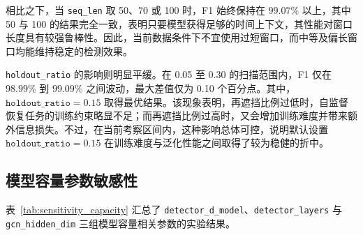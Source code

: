 \documentclass[bachelor, vlined]{DissertUESTC}
\begin{document}
    相比之下，当 \texttt{seq\_len} 取 50、70 或 100 时，F1 始终保持在 \(99.07\%\) 以上，其中 50 与 100 的结果完全一致，表明只要模型获得足够的时间上下文，其性能对窗口长度具有较强鲁棒性。因此，当前数据条件下不宜使用过短窗口，而中等及偏长窗口均能维持稳定的检测效果。

    \texttt{holdout\_ratio} 的影响则明显平缓。在 0.05 至 0.30 的扫描范围内，F1 仅在 \(98.99\%\) 到 \(99.09\%\) 之间波动，最大差值仅为 0.10 个百分点。其中，\(\texttt{holdout\_ratio}=0.15\) 取得最优结果。该现象表明，再遮挡比例过低时，自监督恢复任务的训练约束略显不足；而再遮挡比例过高时，又会增加训练难度并带来额外信息损失。不过，在当前考察区间内，这种影响总体可控，说明默认设置 \(\texttt{holdout\_ratio}=0.15\) 在训练难度与泛化性能之间取得了较为稳健的折中。

    \subsection{模型容量参数敏感性}

    表~\ref{tab:sensitivity_capacity} 汇总了 \texttt{detector\_d\_model}、\texttt{detector\_layers} 与 \texttt{gcn\_hidden\_dim} 三组模型容量相关参数的实验结果。

    \begin{table}[htbp]
        \centering
        \caption{模型容量相关参数的敏感性结果}
        \label{tab:sensitivity_capacity}
        \small
        \setlength{\tabcolsep}{5pt}
        \renewcommand{\arraystretch}{1.15}
    \end{table}
\end{document}
